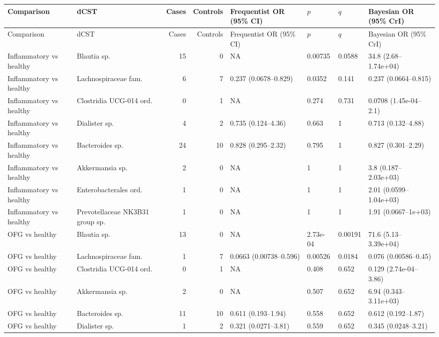 \begingroup
\scriptsize
\setlength{\tabcolsep}{3pt}
\setlength{\LTleft}{0pt}
\setlength{\LTright}{0pt}
\begin{longtable}{@{} p{} p{} r r p{} p{} p{} p{} @{}}
\toprule
Comparison & dCST & Cases & Controls & Frequentist OR (95\% CI) & \(p\) & \(q\) & Bayesian OR (95\% CrI) \\
\midrule
\endfirsthead
\toprule
Comparison & dCST & Cases & Controls & Frequentist OR (95\% CI) & \(p\) & \(q\) & Bayesian OR (95\% CrI) \\
\midrule
\endhead
\bottomrule
\endfoot
Inflammatory vs healthy & Blautia sp. & 15 & 0 & NA & 0.00735 & 0.0588 & 34.8 (2.68--1.74e+04) \\
Inflammatory vs healthy & Lachnospiraceae fam. & 6 & 7 & 0.237 (0.0678--0.829) & 0.0352 & 0.141 & 0.237 (0.0664--0.815) \\
Inflammatory vs healthy & Clostridia UCG-014 ord. & 0 & 1 & NA & 0.274 & 0.731 & 0.0708 (1.45e-04--2.1) \\
Inflammatory vs healthy & Dialister sp. & 4 & 2 & 0.735 (0.124--4.36) & 0.663 & 1 & 0.713 (0.132--4.88) \\
Inflammatory vs healthy & Bacteroides sp. & 24 & 10 & 0.828 (0.295--2.32) & 0.795 & 1 & 0.827 (0.301--2.29) \\
Inflammatory vs healthy & Akkermansia sp. & 2 & 0 & NA & 1 & 1 & 3.8 (0.187--2.03e+03) \\
Inflammatory vs healthy & Enterobacterales ord. & 1 & 0 & NA & 1 & 1 & 2.01 (0.0599--1.04e+03) \\
Inflammatory vs healthy & Prevotellaceae NK3B31 group sp. & 1 & 0 & NA & 1 & 1 & 1.91 (0.0667--1e+03) \\
OFG vs healthy & Blautia sp. & 13 & 0 & NA & 2.73e-04 & 0.00191 & 71.6 (5.13--3.39e+04) \\
OFG vs healthy & Lachnospiraceae fam. & 1 & 7 & 0.0663 (0.00738--0.596) & 0.00526 & 0.0184 & 0.076 (0.00586--0.45) \\
OFG vs healthy & Clostridia UCG-014 ord. & 0 & 1 & NA & 0.408 & 0.652 & 0.129 (2.74e-04--3.86) \\
OFG vs healthy & Akkermansia sp. & 2 & 0 & NA & 0.507 & 0.652 & 6.94 (0.343--3.11e+03) \\
OFG vs healthy & Bacteroides sp. & 11 & 10 & 0.611 (0.193--1.94) & 0.558 & 0.652 & 0.612 (0.192--1.87) \\
OFG vs healthy & Dialister sp. & 1 & 2 & 0.321 (0.0271--3.81) & 0.559 & 0.652 & 0.345 (0.0248--3.21) \\

\end{longtable}
